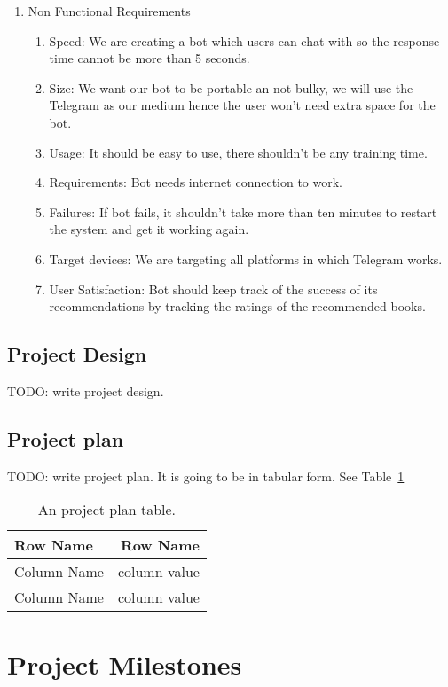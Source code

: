 \documentclass[a4paper]{article}
\begin{document}
\begin{enumerate}
\begin{enumerate}
\begin{enumerate}
    \end{enumerate}
  \end{enumerate}
\item Non Functional Requirements
  \begin{enumerate}
  \item Speed: We are creating a bot which users can chat with so the response time cannot be more than 5 seconds.
  \item Size: We want our bot to be portable an not bulky, we will use the Telegram as our medium hence the user won't need extra space for the bot.
  \item Usage: It should be easy to use, there shouldn't be any training time.
  \item Requirements: Bot needs internet connection to work.
  \item Failures: If bot fails, it shouldn't take more than ten minutes to restart the system and get it working again.
  \item Target devices: We are targeting all platforms in which Telegram works.
  \item User Satisfaction: Bot should keep track of the success of its recommendations by tracking the ratings of the recommended books.
  \end{enumerate}
\end{enumerate}

\subsection{Project Design}

TODO: write project design.

\subsection{Project plan}

TODO: write project plan. It is going to be in tabular form. See Table~\ref{tab:projectplan}

\begin{table}
\centering
\begin{tabular}{l|r}
Row Name & Row Name \\\hline
Column Name & column value \\
Column Name & column value
\end{tabular}
\caption{\label{tab:projectplan}An project plan table.}
\end{table}

\section{Project Milestones}
\end{document}
